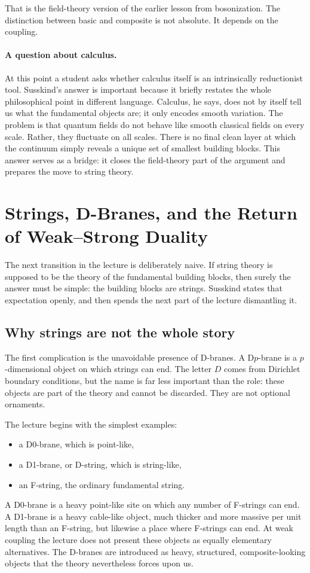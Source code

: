 That is the field-theory version of the earlier lesson from bosonization. The distinction between basic and composite is not absolute. It depends on the coupling.

\paragraph{A question about calculus.}
At this point a student asks whether calculus itself is an intrinsically reductionist tool. Susskind's answer is important because it briefly restates the whole philosophical point in different language. Calculus, he says, does not by itself tell us what the fundamental objects are; it only encodes smooth variation. The problem is that quantum fields do not behave like smooth classical fields on every scale. Rather, they fluctuate on all scales. There is no final clean layer at which the continuum simply reveals a unique set of smallest building blocks. This answer serves as a bridge: it closes the field-theory part of the argument and prepares the move to string theory.

\section{Strings, D-Branes, and the Return of Weak--Strong Duality}

The next transition in the lecture is deliberately naive. If string theory is supposed to be the theory of the fundamental building blocks, then surely the answer must be simple: the building blocks are strings. Susskind states that expectation openly, and then spends the next part of the lecture dismantling it.

\subsection{Why strings are not the whole story}

The first complication is the unavoidable presence of D-branes. A D\(p\)-brane is a \(p\)-dimensional object on which strings can end. The letter \(D\) comes from Dirichlet boundary conditions, but the name is far less important than the role: these objects are part of the theory and cannot be discarded. They are not optional ornaments.

The lecture begins with the simplest examples:
\begin{itemize}
\item a D0-brane, which is point-like,
\item a D1-brane, or D-string, which is string-like,
\item an F-string, the ordinary fundamental string.
\end{itemize}
A D0-brane is a heavy point-like site on which any number of F-strings can end. A D1-brane is a heavy cable-like object, much thicker and more massive per unit length than an F-string, but likewise a place where F-strings can end. At weak coupling the lecture does not present these objects as equally elementary alternatives. The D-branes are introduced as heavy, structured, composite-looking objects that the theory nevertheless forces upon us.

